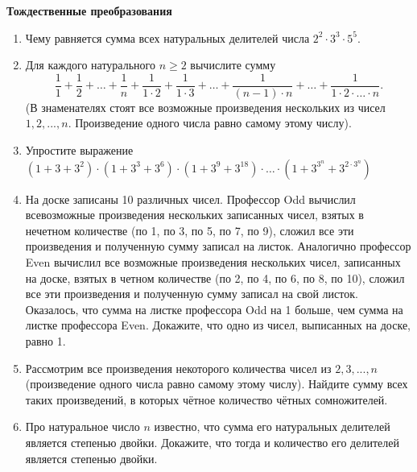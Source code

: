 \documentclass{article}
\begin{document}
\large
	

\begin{center}
\textbf{Тождественные преобразования}
\end{center}

\begin{enumerate}[label*=\protect\fbox{\arabic{enumi}}]
	
	\item Чему равняется сумма всех натуральных делителей числа $2^2 \cdot 3^3 \cdot 5^5.$
	
	\item Для каждого натурального $n \ge 2$ вычислите сумму $$\dfrac{1}{1} + \dfrac{1}{2} + \dotso +  \dfrac{1}{n} + \dfrac{1}{1 \cdot 2} + \dfrac{1}{1 \cdot 3} + \dotso +  \dfrac{1}{(n-1) \cdot n} + \dotso + \dfrac{1}{1 \cdot 2 \cdot \dotso \cdot n}.$$
	(В знаменателях стоят все возможные произведения нескольких из чисел $1, 2, ..., n$. Произведение одного числа равно самому этому числу).
	
	\item Упростите выражение $(1+3+3^2)\cdot (1+3^3 +3^6)\cdot (1+3^9 +3^{18})\cdot \dotsc \cdot  (1+3^{3^n} +3^{2\cdot 3^n})$
	
	\item На доске записаны 10 различных чисел. Профессор Odd вычислил всевозможные произведения нескольких записанных чисел, взятых в нечетном количестве (по 1, по 3, по 5, по 7, по 9), сложил все эти произведения и полученную сумму записал на листок. Аналогично профессор Even вычислил все возможные произведения нескольких чисел, записанных на доске, взятых в четном количестве (по 2, по 4, по 6, по 8, по 10), сложил все эти произведения и полученную сумму записал на свой листок. Оказалось, что сумма на листке профессора Odd на 1 больше, чем сумма на листке профессора Even. Докажите, что одно из чисел, выписанных на доске, равно 1.
	
	\item Рассмотрим все произведения некоторого количества чисел из $2, 3, ..., n$ (произведение одного числа равно самому этому числу). Найдите сумму всех таких произведений, в которых чётное количество чётных сомножителей.
	
	\item Про натуральное число $n$ известно, что сумма его натуральных делителей является степенью двойки. Докажите, что тогда и количество его делителей является степенью двойки.
	
	
	
	
\end{enumerate}
\end{document}
